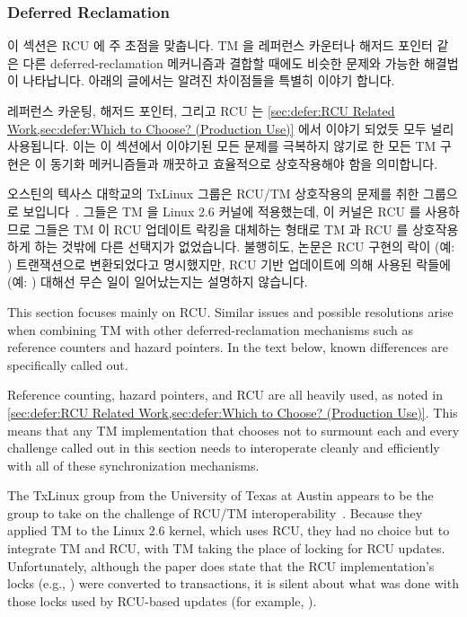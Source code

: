 \fi

\subsubsection{Deferred Reclamation}
\label{sec:future:Deferred Reclamation}

이 섹션은 RCU 에 주 초점을 맞춥니다.
TM 을 레퍼런스 카운터나 해저드 포인터 같은 다른 deferred-reclamation 메커니즘과
결합할 때에도 비슷한 문제와 가능한 해결법이 나타납니다.
아래의 글에서는 알려진 차이점들을 특별히 이야기 합니다.

레퍼런스 카운팅, 해저드 포인터, 그리고 RCU 는
\cref{sec:defer:RCU Related Work,sec:defer:Which to Choose? (Production Use)}
에서 이야기 되었듯 모두 널리 사용됩니다.
이는 이 섹션에서 이야기된 모든 문제를 극복하지 않기로 한 모든 TM 구현은 이
동기화 메커니즘들과 깨끗하고 효율적으로 상호작용해야 함을 의미합니다.

오스틴의 텍사스 대학교의 TxLinux 그룹은 RCU/TM 상호작용의 문제를 취한 그룹으로
보입니다~\cite{ChistopherJRossbach2007a}.
그들은 TM 을 Linux 2.6 커널에 적용했는데, 이 커널은 RCU 를 사용하므로 그들은 TM
이 RCU 업데이트 락킹을 대체하는 형태로 TM 과 RCU 를 상호작용하게 하는 것밖에
다른 선택지가 없었습니다.
불행히도, 논문은 RCU 구현의 락이 (예: ) 트랜잭션으로
변환되었다고 명시했지만, RCU 기반 업데이트에 의해 사용된 락들에(예:
) 대해선 무슨 일이 일어났는지는 설명하지 않습니다.

\iffalse

This section focuses mainly on RCU\@.
Similar issues and possible resolutions arise when combining TM with
other deferred-reclamation mechanisms such as reference counters and
hazard pointers.
In the text below, known differences are specifically called out.

Reference counting, hazard pointers, and RCU are all heavily used, as noted in
\cref{sec:defer:RCU Related Work,sec:defer:Which to Choose? (Production Use)}.
This means that any TM implementation that chooses not to surmount each
and every challenge called out in this section needs to interoperate
cleanly and efficiently with all of these synchronization mechanisms.

The TxLinux group from the University of Texas at Austin appears to be
the group to take on the challenge of RCU/TM
interoperability~\cite{ChistopherJRossbach2007a}.
Because they applied TM to the Linux 2.6 kernel, which uses RCU, they
had no choice but to integrate TM and RCU, with TM taking the place of
locking for RCU updates.
Unfortunately, although the paper does state that the RCU implementation's
locks (e.g., ) were converted to transactions,
it is silent about what was done with those locks used by RCU-based updates
(for example, ).

